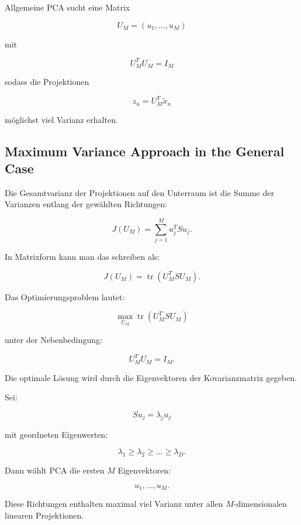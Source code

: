\documentclass[11pt,a4paper]{scrartcl}
\begin{document}
\begin{answerbox}
    Allgemeine PCA sucht eine Matrix

    \[
        \boxed{
            U_M = (u_1,\dots,u_M)
        }
    \]

    mit

    \[
        \boxed{
            U_M^T U_M = I_M
        }
    \]

    sodass die Projektionen

    \[
        \boxed{
            z_n = U_M^T \tilde x_n
        }
    \]

    möglichst viel Varianz erhalten.
\end{answerbox}

\subsection{Maximum Variance Approach in the General Case}

\begin{calculationbox}
    Die Gesamtvarianz der Projektionen auf den Unterraum ist die Summe der
    Varianzen entlang der gewählten Richtungen:

    \[
        J(U_M)
        =
        \sum_{j=1}^{M}
        u_j^T S u_j.
    \]

    In Matrixform kann man das schreiben als:

    \[
        J(U_M)
        =
        \operatorname{tr}(U_M^T S U_M).
    \]

    Das Optimierungsproblem lautet:

    \[
        \max_{U_M}
        \operatorname{tr}(U_M^T S U_M)
    \]

    unter der Nebenbedingung:

    \[
        U_M^T U_M = I_M.
    \]
\end{calculationbox}

\begin{solutionbox}
    Die optimale Lösung wird durch die Eigenvektoren der Kovarianzmatrix gegeben.

    Sei:

    \[
        Su_j = \lambda_j u_j
    \]

    mit geordneten Eigenwerten:

    \[
        \lambda_1 \geq \lambda_2 \geq \dots \geq \lambda_D.
    \]

    Dann wählt PCA die ersten \(M\) Eigenvektoren:

    \[
        u_1,\dots,u_M.
    \]

    Diese Richtungen enthalten maximal viel Varianz unter allen
    \(M\)-dimensionalen linearen Projektionen.
\end{solutionbox}
\end{document}
